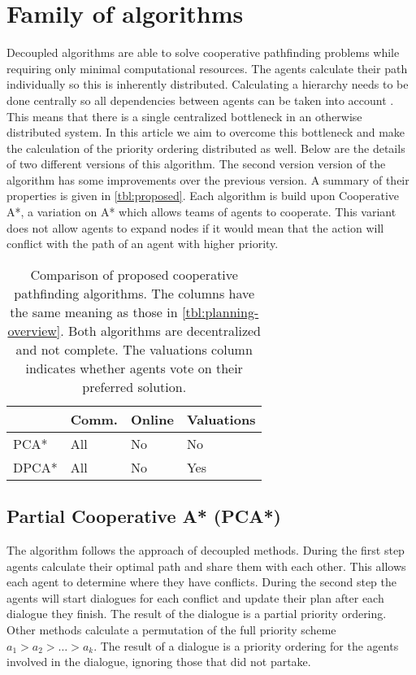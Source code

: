 \section{Family of algorithms}\label{sec:method}
Decoupled algorithms are able to solve cooperative pathfinding problems while
requiring only minimal computational resources. The agents calculate their path 
individually so this is inherently distributed. Calculating a hierarchy needs 
to be done centrally so all dependencies between agents can be taken into 
account \citep{latombe1991,bennewitz2002}. This means that there is a single 
centralized bottleneck in an otherwise distributed system. In this article we 
aim to overcome this bottleneck and make the calculation of the priority 
ordering distributed as well. Below are the details of two different versions 
of this algorithm. The second version version of the algorithm has some 
improvements over the previous version. A summary of their properties is given 
in \autoref{tbl:proposed}. Each algorithm is build upon Cooperative A*, a 
variation on A* \citep{hart1968} which allows teams of agents to cooperate. 
This variant does not allow agents to expand nodes if it would mean that the 
action will conflict with the path of an agent with higher priority.

\begin{table}
    \centering
    \caption{Comparison of proposed cooperative pathfinding algorithms. The 
        columns have the same meaning as those in 
        \autoref{tbl:planning-overview}. Both algorithms are decentralized and 
        not complete. The valuations column indicates whether agents vote on 
        their preferred solution.}
    \label{tbl:proposed}
    \begin{tabular}{l|l|l|l}
        & Comm. & Online & Valuations \\ \hline
        PCA*   & All & No & No \\
        DPCA*  & All & No & Yes \\
    \end{tabular}
\end{table}

\subsection{Partial Cooperative A* (PCA*)}
The algorithm follows the approach of decoupled methods. During the first step 
agents calculate their optimal path and share them with each other. This allows 
each agent to determine where they have conflicts. During the second step the 
agents will start dialogues for each conflict and update their plan after each 
dialogue they finish. The result of the dialogue is a partial priority 
ordering. Other methods calculate a permutation of the full priority scheme 
$a_1 > a_2 > \ldots > a_k$. The result of a dialogue is a priority ordering for 
the agents involved in the dialogue, ignoring those that did not partake.

